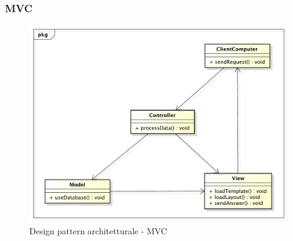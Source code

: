 		
		
		\subsubsection{MVC} %
		\begin{figure}[htbp]
			\centering
			\centerline{\includegraphics[scale=0.5]{./images/designpatternappendice/mvc.pdf}}
			\caption{Design pattern architetturale - MVC}
		\end{figure}


